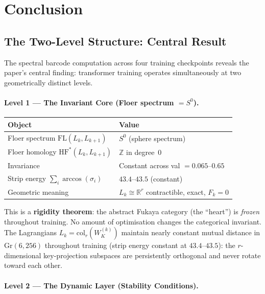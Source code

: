 \documentclass[11pt]{amsart}
\begin{document}
\section{Conclusion}
\label{sec:conclusion}

\subsection{The Two-Level Structure: Central Result}
\label{sec:two_level}

The spectral barcode computation across four training checkpoints
reveals the paper's central finding: transformer training operates
simultaneously at two geometrically distinct levels.

\paragraph{Level 1 — The Invariant Core (Floer spectrum $= S^0$).}

\begin{center}\small
\begin{tabular}{@{}ll@{}}
\toprule
Object & Value \\
\midrule
Floer spectrum $\mathrm{FL}(L_k, L_{k+1})$ & $S^0$ (sphere spectrum) \\
Floer homology $\mathrm{HF}^*(L_k, L_{k+1})$ & $\mathbb{Z}$ in degree~0 \\
Invariance & Constant across val $= 0.065$--$0.65$ \\
Strip energy $\sum_i \arccos(\sigma_i)$ & $43.4$--$43.5$ (constant) \\
Geometric meaning & $L_k \cong \mathbb{R}^r$ contractible, exact, $F_k = 0$ \\
\bottomrule
\end{tabular}
\end{center}

This is a \textbf{rigidity theorem}: the abstract Fukaya category
(the ``heart'') is \emph{frozen} throughout training.
No amount of optimisation changes the categorical invariant.
The Lagrangians $L_k = \mathrm{col}_r(W_K^{(k)})$ maintain
nearly constant mutual distance in $\mathrm{Gr}(6, 256)$ throughout
training (strip energy constant at $43.4$--$43.5$): the
$r$-dimensional key-projection subspaces are persistently
orthogonal and never rotate toward each other.

\paragraph{Level 2 — The Dynamic Layer (Stability Conditions).}
\end{document}
